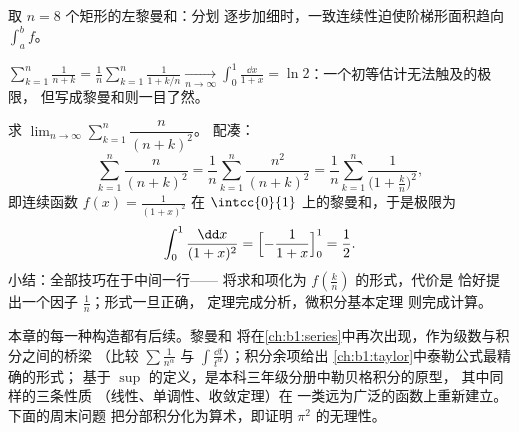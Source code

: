 \begin{omfigure}

{\small 取 $n = 8$ 个矩形的左黎曼和：分划
逐步加细时，一致连续性迫使阶梯形面积趋向
$\int_a^b f$。}
\end{omfigure}

\begin{example}\label{ex:b1:integration:riemannexample}
$\displaystyle\sum_{k=1}^{n} \frac{1}{n + k} = \frac 1n
\sum_{k=1}^{n} \frac{1}{1 + k/n} \xrightarrow[n\to\infty]{}
\int_0^1 \frac{\dd x}{1 + x} = \ln 2$：一个初等估计无法触及的极限，
但写成黎曼和则一目了然。
\end{example}

\begin{example}\label{ex:b1:integration:riemann2}
求 $\lim_{n\to\infty} \sum_{k=1}^{n} \dfrac{n}{(n+k)^2}$。
配凑：
\[
\sum_{k=1}^{n} \frac{n}{(n+k)^2}
= \frac{1}{n}\sum_{k=1}^{n} \frac{n^2}{(n+k)^2}
= \frac1n \sum_{k=1}^{n} \frac{1}{\bigl(1 + \frac kn\bigr)^2} ,
\]
即连续函数 $f(x) = \frac{1}{(1+x)^2}$ 在
$\intcc{0}{1}$ 上的黎曼和，于是极限为
\[
\int_0^1 \frac{\dd x}{(1 + x)^2}
= \Bigl[-\frac{1}{1+x}\Bigr]_0^1 = \frac12 .
\]
小结：全部技巧在于中间一行——
将求和项化为 $f(\frac kn)$ 的形式，代价是
恰好提出一个因子 $\frac1n$；形式一旦正确，
定理完成分析，微积分基本定理
则完成计算。
\end{example}

\begin{remark}[积分的后续应用]
本章的每一种构造都有后续。黎曼和
将在\cref{ch:b1:series}中再次出现，作为级数与积分之间的桥梁
（比较 $\sum \frac{1}{n^\alpha}$ 与 $\int
\frac{\dd t}{t^\alpha}$）；积分余项给出
\cref{ch:b1:taylor}中泰勒公式最精确的形式；
基于 $\sup$ 的定义，是本科三年级分册中勒贝格积分的原型，
其中同样的三条性质
（线性、单调性、收敛定理）在
一类远为广泛的函数上重新建立。下面的周末问题
把分部积分化为算术，即证明
$\pi^2$ 的无理性。
\end{remark}

